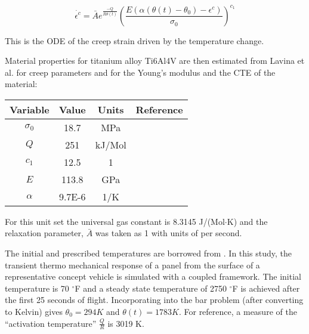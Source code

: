 \documentclass[conf]{new-aiaa}
\begin{document}
\begin{equation}
\dot{\epsilon^c} = \bar{A} e^{\frac{-Q}{R \theta(t)}} \left( \frac{E ( \alpha (\theta(t) - \theta_0) - \epsilon^c)}{\sigma_0} \right)^{c_1}
\end{equation}

This is the ODE of the creep strain driven by the temperature change.

Material properties for titanium alloy Ti6Al4V are then estimated from
Lavina et al. \cite{ lavina_creep_behavior_of_Ti6Al4V_from_450C_to_600C}
for creep parameters and \cite{
boyer_materials_properties_handbook_titanium_alloys}
for the Young's modulus and the CTE of the material:

\begin{center}
\begin{tabular}{|c|c|c|c|}
\hline
Variable & Value & Units & Reference \\
\hline
$\sigma_0$ & 18.7  & MPa   & \cite{lavina_creep_behavior_of_Ti6Al4V_from_450C_to_600C} \\
$Q$      & 251     & kJ/Mol& \cite{lavina_creep_behavior_of_Ti6Al4V_from_450C_to_600C} \\
$c_1$    & 12.5    & 1     & \cite{lavina_creep_behavior_of_Ti6Al4V_from_450C_to_600C} \\
$E$      & 113.8   & GPa   & \cite{ boyer_materials_properties_handbook_titanium_alloys} \\
$\alpha$ & 9.7E-6  & 1/K   & \cite{ boyer_materials_properties_handbook_titanium_alloys} \\
\hline
\end{tabular}
\end{center}

For this unit set the universal gas constant is 8.3145 J/(Mol$\cdot$K)
and the relaxation parameter, $\bar{A}$ was taken as 1 with units of per second.

The initial and prescribed temperatures are borrowed from 
\cite{ culler_impact_of_FTS_coupling_on_response_prediction_hypersonic_skin_panels}.
In this study, the transient thermo mechanical response of a panel from the 
surface of a representative concept vehicle is simulated with a coupled framework.
The initial temperature is 70 $^{\circ}$F and a steady state temperature 
of 2750 $^{\circ}$F is achieved after the first 25 seconds of flight.
Incorporating into the bar problem (after converting to Kelvin) 
gives $\theta_0 = 294 K$ and $\theta(t) = 1783 K$.
For reference, a measure of the ``activation temperature'' 
$\frac{Q}{R}$ is 3019 K.

\newpage

\end{document}
